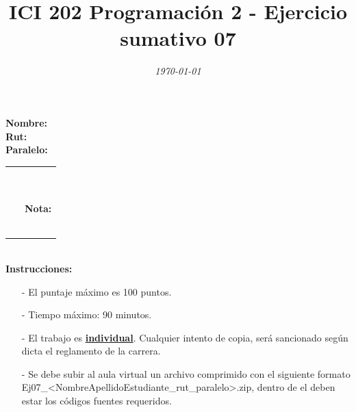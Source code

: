 \documentclass{exam}
\title{\LARGE\color{azul}\textbf{ICI 202 Programaci\'on 2 - Ejercicio sumativo 07 }}
\author{\normalsize \color{gray}{Prof.} \color{black}{\textbf{Ismael Figueroa, Eduardo Godoy}}}
\date{\normalsize \em \today}
\begin{document}

\maketitle

\begin{multicols}{2} \begin{flushleft} \textbf{Nombre:} \\ \vspace*{2mm} \textbf{Rut:} \\ \vspace*{2mm} \textbf{Paralelo:} \end{flushleft} \begin{center} \begin{table}[H] \begin{tabular}{p{4cm}|p{3cm}|} \arrayrulecolor{gray!50}\cline{2-2} ~ & {\em {\scriptsize \color{gray!50}{Puntaje:}}} \\ & ~ \\ ~ & \textbf{Nota:} \\ & ~ \\ \arrayrulecolor{gray!50}\cline{2-2} \end{tabular} \end{table} \end{center} \end{multicols}

\vspace*{-18mm}
\noindent
\textbf{\\Instrucciones:}
\begin{itemize}
    \item[-] El puntaje m\'aximo  es 100 puntos.
    \item[-] Tiempo m\'aximo: 90 minutos.
    \item[-] El trabajo es \underline{\textbf{individual}}. Cualquier intento de copia, ser\'a sancionado seg\'un dicta el reglamento de la carrera.
    \item[-] Se debe subir al aula virtual un archivo comprimido con el siguiente formato \\ Ej07\_<NombreApellidoEstudiante\_rut\_paralelo>.zip, dentro de el deben estar los c\'odigos fuentes requeridos.
\end{itemize}
\end{document}
